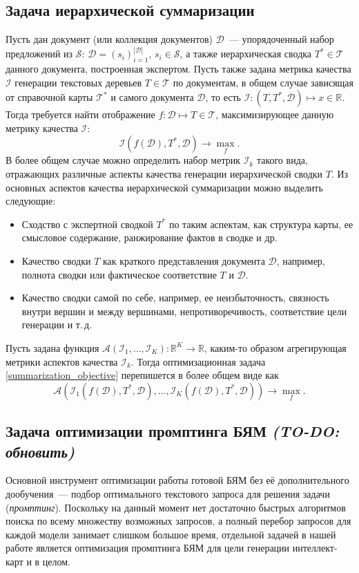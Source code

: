 \documentclass[12pt]{article}
\newcommand{\D}{\mathcal{D}}
\newcommand{\I}{\mathcal{I}}
\renewcommand{\S}{\mathcal{S}}
\newcommand{\R}{\mathbb{R}}
\begin{document}
\subsection{Задача иерархической суммаризации}
Пусть дан документ (или коллекция документов) $\D$~--- упорядоченный набор предложений из $\S$: $\D = \left(s_i\right)_{i=1}^{|\D|}$, $s_i\in \S$, а также иерархическая сводка $T^*\in\mathcal{T}$ данного документа, построенная экспертом. Пусть также задана метрика качества $\I$ генерации текстовых деревьев $T\in\mathcal{T}$ по документам, в общем случае зависящая от справочной карты $\mathcal{T}^*$ и самого документа $\D$, то есть $\I: (T, T^*, \D) \mapsto x\in\R$. Тогда требуется найти отображение $f: \D \mapsto T \in\mathcal{T}$, максимизирующее данную метрику качества $\I$:
\begin{equation} \label{summarization_objective}
    \I(f(\D), T^*, \D) \longrightarrow \max_{f}.
\end{equation}
В более общем случае можно определить набор метрик $\I_k$ такого вида, отражающих различные аспекты качества генерации иерархической сводки $T$. Из основных аспектов качества иерархической суммаризации можно выделить следующие:
\begin{itemize}
    \item Сходство с экспертной сводкой $T^*$ по таким аспектам, как структура карты, ее смысловое содержание, ранжирование фактов в сводке и др.
    \item Качество сводки $T$ как краткого представления документа $\D$, например, полнота сводки или фактическое соответствие $T$ и $\D$.
    \item Качество сводки самой по себе, например, ее неизбыточность, связность внутри вершин и между вершинами, непротиворечивость, соответствие цели генерации и т.\,д.
\end{itemize}
Пусть задана функция $\mathcal{A}(\I_1, \dots, \I_K): \R^K\longrightarrow \R$, каким-то образом агрегирующая метрики аспектов качества $\I_k$. Тогда оптимизационная задача \eqref{summarization_objective} перепишется в более общем виде как
\begin{equation}
    \mathcal{A}\left(\I_1(f(\D), T^*, \D), \dots, \I_K(f(\D), T^*, \D)\right) \longrightarrow \max_{f}.
\end{equation}

\subsection{Задача оптимизации промптинга БЯМ \textit{(TO-DO: обновить)}}
Основной инструмент оптимизации работы готовой БЯМ без её дополнительного дообучения~--- подбор оптимального текстового запроса для решения задачи (\textit{промптинг}). Поскольку на данный момент нет достаточно быстрых алгоритмов поиска по всему множеству возможных запросов, а полный перебор запросов для каждой модели занимает слишком большое время, отдельной задачей в нашей работе является оптимизация промптинга БЯМ для цели генерации интеллект-карт и в целом.
\end{document}
